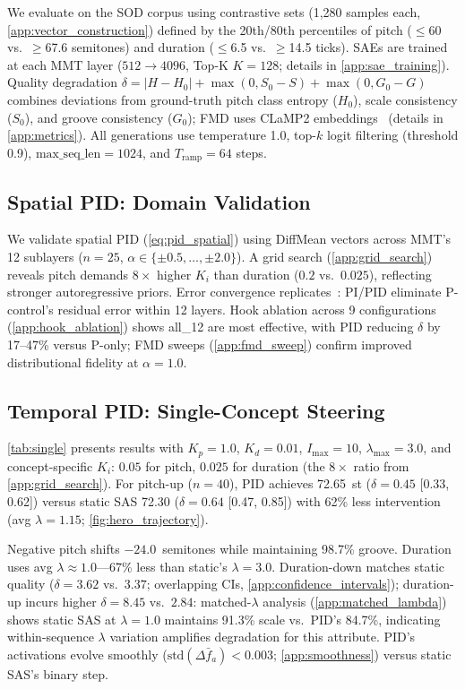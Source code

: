 \documentclass{article}
\theoremstyle{plain}
\begin{document}
We evaluate on the SOD corpus using contrastive sets (1,280 samples each, \cref{app:vector_construction}) defined by the 20th/80th percentiles of pitch ($\leq$60 vs.\ $\geq$67.6 semitones) and duration ($\leq$6.5 vs.\ $\geq$14.5 ticks). SAEs are trained at each MMT layer ($512 {\to} 4096$, Top-K $K{=}128$; details in \cref{app:sae_training}). Quality degradation $\delta = |H - H_0| + \max(0, S_0 - S) + \max(0, G_0 - G)$ combines deviations from ground-truth pitch class entropy ($H_0$), scale consistency ($S_0$), and groove consistency ($G_0$); FMD uses CLaMP2 embeddings~\cite{wu2024clamp2} (details in \cref{app:metrics}). All generations use temperature 1.0, top-$k$ logit filtering (threshold 0.9), $\text{max\_seq\_len}{=}1024$, and $T_\text{ramp}{=}64$ steps.

\subsection{Spatial PID: Domain Validation}
\label{sec:spatial_results}

We validate spatial PID (\cref{eq:pid_spatial}) using DiffMean vectors across MMT's 12 sublayers ($n{=}25$, $\alpha \in \{\pm 0.5, \ldots, \pm 2.0\}$). A grid search (\cref{app:grid_search}) reveals pitch demands $8{\times}$ higher $K_i$ than duration ($0.2$ vs.\ $0.025$), reflecting stronger autoregressive priors. Error convergence replicates~\citet{nguyen2026pid}: PI/PID eliminate P-control's residual error within 12 layers. Hook ablation across 9 configurations (\cref{app:hook_ablation}) shows all\_12 are most effective, with PID reducing $\delta$ by 17--47\% versus P-only; FMD sweeps (\cref{app:fmd_sweep}) confirm improved distributional fidelity at $\alpha{=}1.0$.

\subsection{Temporal PID: Single-Concept Steering}
\label{sec:single}

\cref{tab:single} presents results with $K_p{=}1.0$, $K_d{=}0.01$, $I_\text{max}{=}10$, $\lambda_\text{max}{=}3.0$, and concept-specific $K_i$: $0.05$ for pitch, $0.025$ for duration (the $8{\times}$ ratio from \cref{app:grid_search}). For pitch-up ($n{=}40$), PID achieves 72.65~st ($\delta{=}0.45$ [0.33, 0.62]) versus static SAS 72.30 ($\delta{=}0.64$ [0.47, 0.85]) with 62\% less intervention (avg $\lambda{=}1.15$; \cref{fig:hero_trajectory}).

Negative pitch shifts $-24.0$~semitones while maintaining 98.7\% groove. Duration uses avg $\lambda \approx 1.0$---67\% less than static's $\lambda{=}3.0$. Duration-down matches static quality ($\delta{=}3.62$ vs.\ $3.37$; overlapping CIs, \cref{app:confidence_intervals}); duration-up incurs higher $\delta{=}8.45$ vs.\ $2.84$: matched-$\lambda$ analysis (\cref{app:matched_lambda}) shows static SAS at $\lambda{=}1.0$ maintains 91.3\% scale vs.\ PID's 84.7\%, indicating within-sequence $\lambda$ variation amplifies degradation for this attribute. PID's activations evolve smoothly ($\text{std}(\Delta \bar{f}_a) < 0.003$; \cref{app:smoothness}) versus static SAS's binary step.
\end{document}
